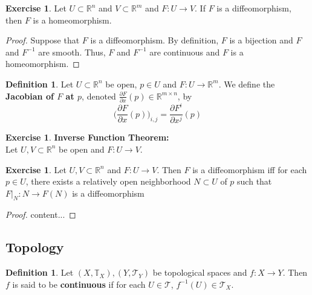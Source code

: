 \documentclass[12pt]{amsart}
\theoremstyle{definition}
\newtheorem{defn}[definition]{Definition}
\newtheorem{ex}[definition]{Exercise}
\newcommand{\R}{\mathbb{R}}
\newcommand{\T}{\mathbb{T}}
\newcommand{\MT}{\mathcal{T}}
\newcommand{\p}{\partial}
\begin{document}
	\begin{ex}
	Let $U \subset \R^n$ and $V \subset \R^m$ and $F: U \rightarrow V$. If $F$ is a diffeomorphism, then $F$ is a homeomorphism.
	\end{ex}
	
	\begin{proof}
	Suppose that $F$ is a diffeomorphism. By definition, $F$ is a bijection and $F$ and $F^{-1}$ are smooth. Thus, $F$ and $F^{-1}$ are continuous and $F$ is a homeomorphism.
	\end{proof}
	
	\begin{defn}
	Let $U \subset \R^n$ be open, $p \in U$ and $F: U \rightarrow \R^m$. We define the \textbf{Jacobian of $F$ at $p$}, denoted $\frac{\p F}{\p x}(p) \in \R^{m \times n}$, by $$\bigg (\frac{\p F}{\p x}(p) \bigg )_{i,j} = \frac{\p F^i}{\p x^j}(p)$$
	\end{defn}
	
	\begin{ex}\textbf{Inverse Function Theorem:}\\
	Let $U,V \subset \R^n$ be open and $F: U \rightarrow V$.
	\end{ex}
	
	\begin{ex}
		Let $U,V \subset \R^n$ and $F: U \rightarrow V$. Then $F$ is a diffeomorphism iff for each $p \in U$, there exists a relatively open neighborhood $N \subset U$ of $p$ such that $F|_N:N \rightarrow F(N)$ is a diffeomorphism
	\end{ex}
	
	\begin{proof}
		content...
	\end{proof}
















\newpage
\subsection{Topology}

\begin{defn}
Let $(X, \T_X), (Y, \MT_Y)$ be topological spaces and $f:X\rightarrow Y$. Then $f$ is said to be \textbf{continuous} if for each $U \in \MT$, $f^{-1}(U) \in \MT_X$.
\end{defn}
\end{document}

